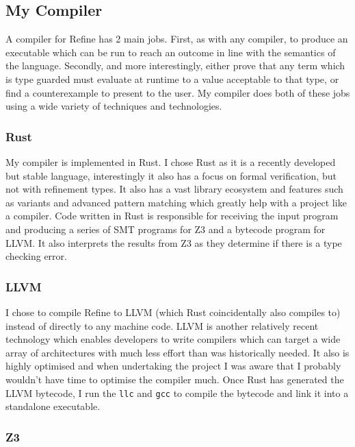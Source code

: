 \subsection{My Compiler}

A compiler for Refine has 2 main jobs.
First, as with any compiler, to produce an executable which can be run to reach an outcome in line
with the semantics of the language.
Secondly, and more interestingly, either prove that any term which is type guarded must evaluate
at runtime to a value acceptable to that type, or find a counterexample to present to the user.
My compiler does both of these jobs using a wide variety of techniques and technologies.

\subsubsection{Rust}

My compiler is implemented in Rust.
I chose Rust as it is a recently developed but stable language, interestingly it also has a focus
on formal verification, but not with refinement types.
It also has a vast library ecosystem and features such as variants and advanced pattern matching
which greatly help with a project like a compiler.
Code written in Rust is responsible for receiving the input program and producing a series of SMT
programs for Z3 and a bytecode program for LLVM.
It also interprets the results from Z3 as they determine if there is a type checking error.

\subsubsection{LLVM}

I chose to compile Refine to LLVM (which Rust coincidentally also compiles to) instead of
directly to any machine code.
LLVM is another relatively recent technology which enables developers to write compilers which can
target a wide array of architectures with much less effort than was historically needed.
It also is highly optimised and when undertaking the project I was aware that I probably wouldn't
have time to optimise the compiler much.
Once Rust has generated the LLVM bytecode, I run the \texttt{llc} and \texttt{gcc} to compile the
bytecode and link it into a standalone executable.

\subsubsection{Z3}

